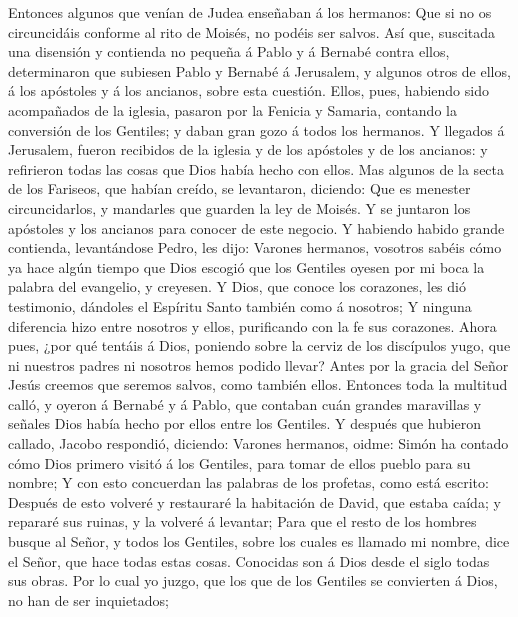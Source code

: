  Entonces algunos que venían de Judea enseñaban á los
hermanos: Que si no os circuncidáis conforme al rito de Moisés, no
podéis ser salvos.  Así que, suscitada una disensión y
contienda no pequeña á Pablo y á Bernabé contra ellos, determinaron que
subiesen Pablo y Bernabé á Jerusalem, y algunos otros de ellos, á los
apóstoles y á los ancianos, sobre esta cuestión.  Ellos,
pues, habiendo sido acompañados de la iglesia, pasaron por la Fenicia y
Samaria, contando la conversión de los Gentiles; y daban gran gozo á
todos los hermanos.  Y llegados á Jerusalem, fueron
recibidos de la iglesia y de los apóstoles y de los ancianos: y
refirieron todas las cosas que Dios había hecho con ellos. 
Mas algunos de la secta de los Fariseos, que habían creído, se
levantaron, diciendo: Que es menester circuncidarlos, y mandarles que
guarden la ley de Moisés.  Y se juntaron los apóstoles y los
ancianos para conocer de este negocio.  Y habiendo habido
grande contienda, levantándose Pedro, les dijo: Varones hermanos,
vosotros sabéis cómo ya hace algún tiempo que Dios escogió que los
Gentiles oyesen por mi boca la palabra del evangelio, y creyesen.
 Y Dios, que conoce los corazones, les dió testimonio,
dándoles el Espíritu Santo también como á nosotros;  Y
ninguna diferencia hizo entre nosotros y ellos, purificando con la fe
sus corazones.  Ahora pues, ¿por qué tentáis á Dios,
poniendo sobre la cerviz de los discípulos yugo, que ni nuestros padres
ni nosotros hemos podido llevar?  Antes por la gracia del
Señor Jesús creemos que seremos salvos, como también ellos.
 Entonces toda la multitud calló, y oyeron á Bernabé y á
Pablo, que contaban cuán grandes maravillas y señales Dios había hecho
por ellos entre los Gentiles.  Y después que hubieron
callado, Jacobo respondió, diciendo: Varones hermanos, oidme:
 Simón ha contado cómo Dios primero visitó á los Gentiles,
para tomar de ellos pueblo para su nombre;  Y con esto
concuerdan las palabras de los profetas, como está escrito:
 Después de esto volveré y restauraré la habitación de
David, que estaba caída; y repararé sus ruinas, y la volveré á levantar;
 Para que el resto de los hombres busque al Señor, y todos
los Gentiles, sobre los cuales es llamado mi nombre, dice el Señor, que
hace todas estas cosas.  Conocidas son á Dios desde el
siglo todas sus obras.  Por lo cual yo juzgo, que los que
de los Gentiles se convierten á Dios, no han de ser inquietados;
